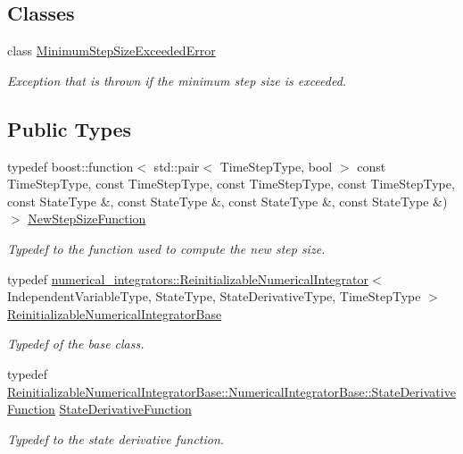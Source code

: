 \subsection*{Classes}
\begin{DoxyCompactItemize}
\item 
class \hyperlink{classtudat_1_1numerical__integrators_1_1RungeKuttaVariableStepSizeIntegrator_1_1MinimumStepSizeExceededError}{Minimum\+Step\+Size\+Exceeded\+Error}
\begin{DoxyCompactList}\small\item\em Exception that is thrown if the minimum step size is exceeded. \end{DoxyCompactList}\end{DoxyCompactItemize}
\subsection*{Public Types}
\begin{DoxyCompactItemize}
\item 
typedef boost\+::function$<$ std\+::pair$<$ Time\+Step\+Type, bool $>$ const Time\+Step\+Type, const Time\+Step\+Type, const Time\+Step\+Type, const Time\+Step\+Type, const State\+Type \&, const State\+Type \&, const State\+Type \&, const State\+Type \&) $>$ \hyperlink{classtudat_1_1numerical__integrators_1_1RungeKuttaVariableStepSizeIntegrator_a7f439a647db26cafc16b08f5b2922868}{New\+Step\+Size\+Function}
\begin{DoxyCompactList}\small\item\em Typedef to the function used to compute the new step size. \end{DoxyCompactList}\item 
typedef \hyperlink{classtudat_1_1numerical__integrators_1_1ReinitializableNumericalIntegrator}{numerical\+\_\+integrators\+::\+Reinitializable\+Numerical\+Integrator}$<$ Independent\+Variable\+Type, State\+Type, State\+Derivative\+Type, Time\+Step\+Type $>$ \hyperlink{classtudat_1_1numerical__integrators_1_1RungeKuttaVariableStepSizeIntegrator_a0ea5ab73d75b211e5f040d11f3a79fcb}{Reinitializable\+Numerical\+Integrator\+Base}
\begin{DoxyCompactList}\small\item\em Typedef of the base class. \end{DoxyCompactList}\item 
typedef \hyperlink{classtudat_1_1numerical__integrators_1_1NumericalIntegrator_a0d0a5d48ebaf1f5ad9cd7a73b44be0fc}{Reinitializable\+Numerical\+Integrator\+Base\+::\+Numerical\+Integrator\+Base\+::\+State\+Derivative\+Function} \hyperlink{classtudat_1_1numerical__integrators_1_1RungeKuttaVariableStepSizeIntegrator_af14688890a16e581771f63f0e2909b46}{State\+Derivative\+Function}
\begin{DoxyCompactList}\small\item\em Typedef to the state derivative function. \end{DoxyCompactList}\end{DoxyCompactItemize}
